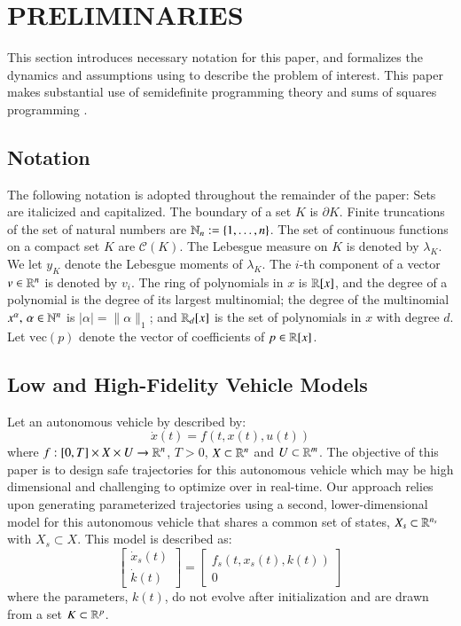 \section{PRELIMINARIES}
\label{sec:notation}

This section introduces necessary notation for this paper, and formalizes the dynamics and assumptions using to describe the problem of interest.
This paper makes substantial use of semidefinite programming theory and sums of squares programming \cite{lasserre2009moments}.

\subsection{Notation}

The following notation is adopted throughout the remainder of the paper: 
Sets are italicized and capitalized.
The boundary of a set $K$ is $\partial K$.
Finite truncations of the set of natural numbers are \mbox{$\mathbb{N}_n:=\{1,\ldots,n\}$}.
The set of continuous functions on a compact set $K$ are $\mathcal C(K)$.
The Lebesgue measure on $K$ is denoted by $\lambda_K$.
We let $y_{K}$ denote the Lebesgue moments of $\lambda_K$.
The $i$-th component of a vector $v \in \mathbb{R}^n$ is denoted by $v_i$.
The ring of polynomials in $x$ is $\mathbb{R}[x]$, and the degree of a polynomial is the degree of its largest multinomial; 
the degree of the multinomial $x^\alpha,\,\alpha\in \mathbb{N}^n$ is $|\alpha|=\|\alpha\|_1$; and $\mathbb{R}_d[x]$ is the set of polynomials in $x$ with degree $d$.
Let $\text{vec}(p)$ denote the vector of coefficients of $p \in \mathbb{R}[x]$.

\subsection{Low and High-Fidelity Vehicle Models}

Let an autonomous vehicle by described by:
\begin{equation}
\label{eq:big_dyn}
\dot{x}(t) = f(t,x(t),u(t))
\end{equation}
where $f:[0,T] \times X \times U \to \mathbb{R}^n$, $T > 0$, $ X \subset \mathbb{R}^n$ and $U \subset \mathbb{R}^m$. 
The objective of this paper is to design safe trajectories for this autonomous vehicle which may be high dimensional and challenging to optimize over in real-time.
Our approach relies upon generating parameterized trajectories using a second, lower-dimensional model for this autonomous vehicle that shares a common set of states, $X_s \subset \mathbb{R}^{n_s}$ with $X_s \subset X$.
This model is described as:
\begin{equation}
\label{eq:small_dyn}
\begin{bmatrix}\dot{x}_s(t) \\ \dot{k}(t) \end{bmatrix} = \begin{bmatrix}  f_s(t,x_s(t),k(t)) \\ 0 \end{bmatrix}
\end{equation}
where the parameters, $k(t)$, do not evolve after initialization and are drawn from a set $K \subset \mathbb{R}^p$. 

